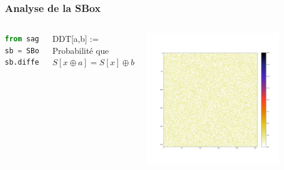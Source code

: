 \begin{frame}[fragile] %
\frametitle{Analyse de la SBox}
  \begin{columns}[c]
        \begin{lstlisting}[language=Python]
from sage.crypto.sbox import SBox
sb = SBox(S)
sb.difference_distribution_table()
\end{lstlisting}
        \begin{outline}
            \1 DDT[a,b] := Probabilité que $S[x\oplus a] = S[x]\oplus b$
            
        \end{outline}
        \begin{center}                  
            \includegraphics[trim=30pt 140pt 30pt 140pt, clip, width=0.9\textwidth]{img/crypto/jafar/AES-ddt.png}
        \end{center}
        \pause 
        \begin{center}                  

\end{center}
\end{columns}
\end{frame}
